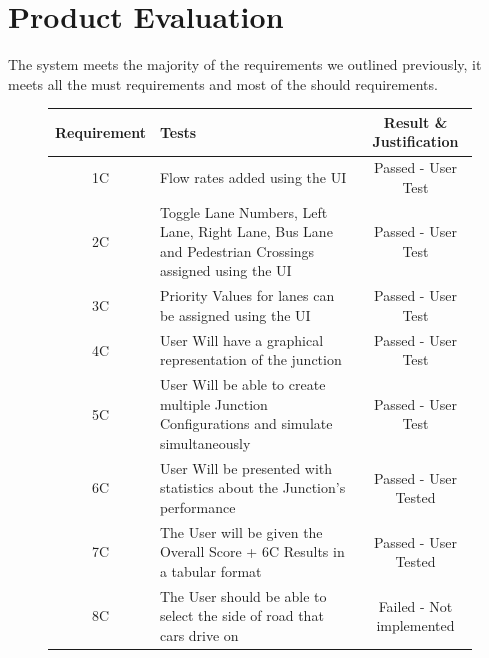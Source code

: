 \documentclass{article}
\begin{document}
    \section{Product Evaluation}

    The system meets the majority of the requirements we outlined previously, it meets all the must requirements and
    most of the should requirements.

    \begin{figure}[H]
        \begin{center}
            \begin{tabular}{ |c|p{9cm}|c| }
                \hline
                Requirement & Tests                                                                                               & Result \& Justification        \\
                \hline
                1C          & Flow rates added using the UI                                                                       & Passed - User Test             \\
                \hline
                2C          & Toggle Lane Numbers, Left Lane, Right Lane, Bus Lane and Pedestrian Crossings assigned using the UI & Passed - User Test \\
                \hline
                3C          & Priority Values for lanes can be assigned using the UI                                              & Passed - User Test             \\
                \hline
                4C          & User Will have a graphical representation of the junction                                           & Passed - User Test             \\
                \hline
                5C          & User Will be able to create multiple Junction Configurations and simulate simultaneously & Passed - User Test \\
                \hline
                6C          & User Will be presented with statistics about the Junction's performance                             & Passed - User Tested           \\
                \hline
                7C          & The User will be given the Overall Score + 6C Results in a tabular format                           & Passed - User Tested           \\
                \hline
                8C          & The User should be able to select the side of road that cars drive on                               & Failed - Not implemented       \\

\end{tabular}
\end{center}
\end{figure}
\end{document}
